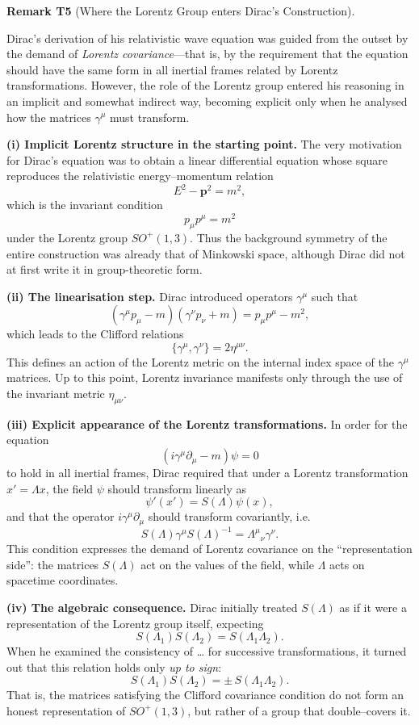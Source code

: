 \documentclass[10pt, letterpaper]{article}
\newcommand{\CustomHeading}[3]{%
  \par\medskip\noindent%
  \textbf{#1 #2} \textnormal{(#3)}.\enskip%
}
\newenvironment{REM}[2]{\begin{unitbox}\CustomHeading{Remark}{#1}{#2}}{\end{unitbox}}
\begin{document}
\begin{REM}{T5}{Where the Lorentz Group enters Dirac’s Construction}
Dirac’s derivation of his relativistic wave equation was guided from the outset by the demand of \emph{Lorentz covariance}—that is, by the requirement that the equation should have the same form in all inertial frames related by Lorentz transformations.  
However, the role of the Lorentz group entered his reasoning in an implicit and somewhat indirect way, becoming explicit only when he analysed how the matrices $\gamma^\mu$ must transform.

\medskip

\textbf{(i) Implicit Lorentz structure in the starting point.}  
The very motivation for Dirac’s equation was to obtain a linear differential equation whose square reproduces the relativistic energy--momentum relation
\[
E^2-\mathbf{p}^2 = m^2,
\]
which is the invariant condition
\[
p_\mu p^\mu = m^2
\]
under the Lorentz group $SO^+(1,3)$.  
Thus the background symmetry of the entire construction was already that of Minkowski space, although Dirac did not at first write it in group-theoretic form.

\medskip

\textbf{(ii) The linearisation step.}  
Dirac introduced operators $\gamma^\mu$ such that
\[
(\gamma^\mu p_\mu - m)(\gamma^\nu p_\nu + m) = p_\mu p^\mu - m^2,
\]
which leads to the Clifford relations
\[
\{\gamma^\mu,\gamma^\nu\} = 2\eta^{\mu\nu}.
\]
This defines an action of the Lorentz metric on the internal index space of the $\gamma^\mu$ matrices.  
Up to this point, Lorentz invariance manifests only through the use of the invariant metric $\eta_{\mu\nu}$.

\medskip

\textbf{(iii) Explicit appearance of the Lorentz transformations.}  
In order for the equation
\[
(i\gamma^\mu\partial_\mu - m)\psi = 0
\]
to hold in all inertial frames, Dirac required that under a Lorentz transformation $x'=\Lambda x$, the field $\psi$ should transform linearly as
\[
\psi'(x') = S(\Lambda)\psi(x),
\]
and that the operator $i\gamma^\mu\partial_\mu$ should transform covariantly, i.e.
\[
S(\Lambda)\gamma^\mu S(\Lambda)^{-1} = \Lambda^\mu{}_\nu\gamma^\nu.
\]
This condition expresses the demand of Lorentz covariance on the ``representation side'': the matrices $S(\Lambda)$ act on the values of the field, while $\Lambda$ acts on spacetime coordinates.

\medskip

\textbf{(iv) The algebraic consequence.}  
Dirac initially treated $S(\Lambda)$ as if it were a representation of the Lorentz group itself, expecting
\[
S(\Lambda_1)S(\Lambda_2)=S(\Lambda_1\Lambda_2).
\]
When he examined the consistency of … for successive transformations, it turned out that this relation holds only \emph{up to sign}:
\[
S(\Lambda_1)S(\Lambda_2)=\pm\,S(\Lambda_1\Lambda_2).
\]
That is, the matrices satisfying the Clifford covariance condition do not form an honest representation of $SO^+(1,3)$, but rather of a group that double--covers it.


\end{REM}
\end{document}
